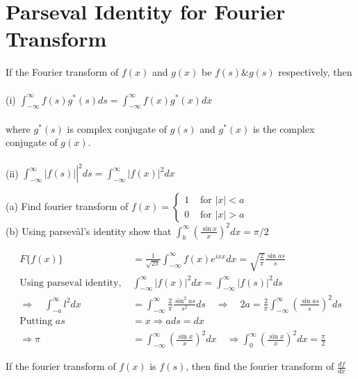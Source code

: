 \section{Parseval Identity for Fourier Transform}
If the Fourier transform of $f(x)$ and $g(x)$ be $f(s) \& g(s)$ respectively, then\\\\
(i) $\int_{-\infty}^{\infty} f(s) g^{*}(s) d s=\int_{-\infty}^{\infty} f(x) g^{*}(x) d x$\\\\
where $g^{*}(s)$ is complex conjugate of $g(s)$ and $g^{*}(x)$ is the complex conjugate of $g(x)$.\\\\
(ii) $\left.\int_{-\infty}^{\infty}|f(s)|\right|^{2} d s=\int_{-\infty}^{\infty}|f(x)|^{2} d x$
\begin{exercise}
	(a) Find fourier transform of $f(x)= \begin{cases}1 & \text { for }|x|<a \\ 0 & \text { for }|x|>a\end{cases}$\\
	(b) Using parsevàl's identity show that $\int_{b}^{\infty}\left(\frac{\sin x}{x}\right)^{2} d x=\pi / 2$
\end{exercise}
\begin{answer}
	\begin{align*}
	F\{f(x)\}&=\frac{1}{\sqrt{2 \pi}} \int_{-\infty}^{\infty} f(x) e^{i x x} d x=\sqrt{\frac{2}{\pi}} \frac{\sin a s}{s}\\
	\text{Using parseval identity, }&\int_{-\infty}^{\infty}|f(x)|^{2} d x=\int_{-\infty}^{\infty}|f(s)|^{2} d s\\
	\Rightarrow \quad \int_{-a}^{\infty} l^{2} d x&=\int_{-\infty}^{\infty} \frac{2}{\pi} \frac{\sin ^{2} a s}{s^{2}} d s \quad \Rightarrow \quad 2 a=\frac{2}{\pi} \int_{-\infty}^{\infty}\left(\frac{\sin a s}{s}\right)^{2} d s\\
	\text{Putting }a s&=x \Rightarrow a d s=d x\\
	\Rightarrow \pi&=\int_{-\infty}^{\infty}\left(\frac{\sin x}{x}\right)^{2} d x \quad \Rightarrow \int_{0}^{\infty}\left(\frac{\sin x}{x}\right)^{2} d x=\frac{\pi}{2}
	\end{align*}
\end{answer}
\begin{exercise}
	If the fourier transform of $f(x)$ is $f(s)$, then find the fourier transform of $\frac{d f}{d x}$
\end{exercise}
